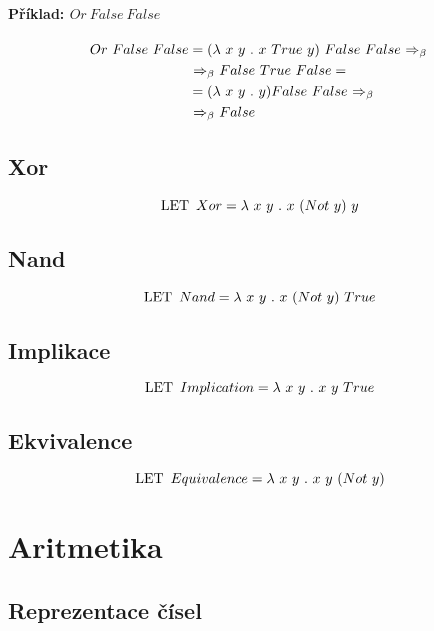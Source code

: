 \paragraph*{Příklad: $Or ~ False ~ False$}
\begin{equation}
    \begin{split}
        Or ~ False ~ False &= (\lk x ~ y \lkdot x ~ True ~ y) ~ False ~ False \lkbeta \\
        &\lkbeta False ~ True ~ False = \\
        &= (\lk x ~ y \lkdot y) False ~ False \lkbeta \\
        &\lkbeta False
    \end{split}
\end{equation}

\subsection{Xor}

$$ \lklet Xor = \lk x ~ y \lkdot x ~ (Not ~ y) ~ y $$

\subsection{Nand}

$$ \lklet Nand = \lk x ~ y \lkdot x ~ (Not ~ y) ~ True $$

\subsection{Implikace}

$$ \lklet Implication = \lk x ~ y \lkdot x ~ y ~ True $$

\subsection{Ekvivalence}

$$ \lklet Equivalence = \lk x ~ y \lkdot x ~ y ~ (Not ~ y) $$


\section{Aritmetika}

\subsection{Reprezentace čísel}

